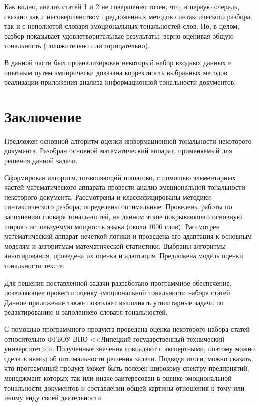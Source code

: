 \documentclass[a4paper,14pt,russian]{extreport}
\makeatletter
\renewcommand{\section}{\@startsection{section}{1}{\parindent}{3ex}{3ex}{\normalfont}}
\makeatother
\begin{document}
Как видно, анализ статей 1 и 2 не совершенно точен, что, в первую очередь, связано как с несовершенством предложенных методов синтаксического разбора, так и с неполнотой словаря эмоциональных тональностей слов. Но, в целом, разбор показывает удовлетворительные результаты, верно оценивая общую тональность (положительно или отрицательно).

\section{Выводы}

В данной части был проанализирован некоторый набор входных данных и опытным путем эмпирически доказана корректность выбранных методов реализации приложения анализа информационной тональности документов.
\newpage
\chapter*{Заключение}

Предложен основной алгоритм оценки информационной тональности некоторого документа. Разобран основной математический аппарат, применяемый для решения данной задачи.

Сформирован алгоритм, позволяющий пошагово, с помощью элементарных частей математического аппарата провести анализ эмециональной тональности некоторого документа. Рассмотрены и классифицированы методики синтаксического разбора; определены оптимальные. Проведены работы по заполнению словаря тональностей, на данном этапе покрывающего основную широко используемую мощность языка (около 4000 слов). Рассмотрен математический аппарат нечеткой логики и проведена его адаптация к основным моделям и алгоритмам математической статистики. Выбраны алгоритмы аннотирования, проведена их оценка и адаптация. Предложена модель оценки тональности текста.

Для решения поставленной задачи разработано программное обеспечение, позволяющее провести оценку эмоциональной тональности набора статей. Данное приложение также позволяет выполнять утилитарные задачи по редактированию и заполениею словаря тональностей.

С помощью программного продукта проведена оценка некоторого набора статей относительно ФГБОУ ВПО <<Липецкий государственный технический университет>>. Полученные значения совпадают с экспертными, поэтому можно сделать вывод об оптимальности решения задачи. Подводя итоги, можно сказать, что программный продукт может быть полезен широкому спектру предприятий, менеджмент которых так или иначе заитересован в оценке эмоциональной тональности документов и составлении общей картины отношения к тому или иному виду своей деятельности.
\end{document}
